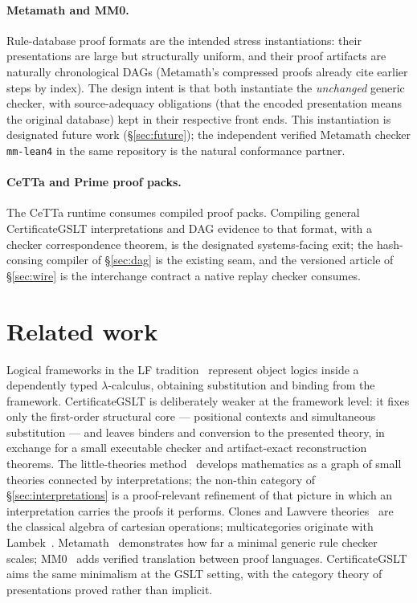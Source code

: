 \documentclass[]{article}
\theoremstyle{remark}
\newcommand{\code}[1]{\texttt{#1}}
\newcommand{\GSLT}{\textup{GSLT}}
\newcommand{\CertificateGSLT}{\textup{CertificateGSLT}}
\begin{document}
\paragraph{Metamath and MM0.}
Rule-database proof formats are the intended stress instantiations: their
presentations are large but structurally uniform, and their proof artifacts
are naturally chronological DAGs (Metamath's compressed proofs already cite
earlier steps by index).  The design intent is that both instantiate the
\emph{unchanged} generic checker, with source-adequacy obligations (that the
encoded presentation means the original database) kept in their respective
front ends.  This instantiation is designated future work
(\S\ref{sec:future}); the independent verified Metamath checker
\code{mm-lean4} in the same repository is the natural conformance partner.

\paragraph{CeTTa and Prime proof packs.}
The CeTTa runtime consumes compiled proof packs.  Compiling general
\CertificateGSLT{} interpretations and DAG evidence to that format, with a checker
correspondence theorem, is the designated systems-facing exit; the
hash-consing compiler of \S\ref{sec:dag} is the existing seam, and the
versioned article of \S\ref{sec:wire} is the interchange contract a native
replay checker consumes.

\section{Related work}
\label{sec:related}

Logical frameworks in the LF tradition~\cite{hhp1993lf} represent object
logics inside a dependently typed $\lambda$-calculus, obtaining substitution
and binding from the framework.  \CertificateGSLT{} is deliberately weaker at the
framework level: it fixes only the first-order structural core ---
positional contexts and simultaneous substitution --- and leaves binders and
conversion to the presented theory, in exchange for a small executable
checker and artifact-exact reconstruction theorems.  The little-theories
method~\cite{farmer1992little} develops mathematics as a graph of small
theories connected by interpretations; the non-thin category of
\S\ref{sec:interpretations} is a proof-relevant refinement of that picture
in which an interpretation carries the proofs it performs.  Clones and
Lawvere theories~\cite{lawvere1963functorial} are the classical algebra of
cartesian operations; multicategories originate with
Lambek~\cite{lambek1969deductive}.  Metamath~\cite{megill2019metamath}
demonstrates how far a minimal generic rule checker scales;
MM0~\cite{carneiro2020mm0} adds verified translation between proof
languages.  \CertificateGSLT{} aims the same minimalism at the \GSLT{} setting,
with the category theory of presentations proved rather than implicit.
\end{document}
